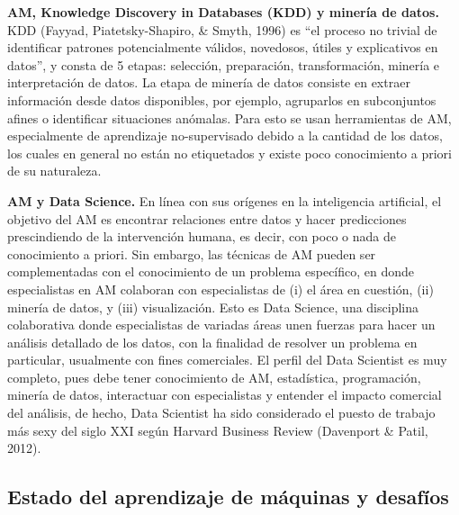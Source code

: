 \textbf{AM, Knowledge Discovery in Databases (KDD) y minería de datos.} KDD (Fayyad, Piatetsky-Shapiro, \& Smyth, 1996) es “el proceso no trivial de identificar patrones potencialmente válidos, novedosos, útiles y explicativos en datos”, y consta de 5 etapas: selección, preparación, transformación, minería e interpretación de datos. La etapa de minería de datos  consiste en extraer información desde datos disponibles, por ejemplo, agruparlos en subconjuntos afines o identificar situaciones anómalas. Para esto se usan herramientas de AM, especialmente de aprendizaje no-supervisado debido a la cantidad de los datos, los cuales en general no están no etiquetados y existe poco conocimiento a priori de su naturaleza. 

\textbf{AM y Data Science.} En línea con sus orígenes en la inteligencia artificial, el objetivo del AM es encontrar relaciones entre datos y hacer predicciones prescindiendo de la intervención humana, es decir, con poco o nada de conocimiento a priori. Sin embargo, las técnicas de AM pueden ser complementadas con el conocimiento de un problema específico, en donde especialistas en AM colaboran con especialistas de (i) el área en cuestión, (ii) minería de datos, y (iii) visualización. Esto es Data Science, una disciplina colaborativa donde especialistas de variadas áreas unen fuerzas para hacer un análisis detallado de los datos, con la finalidad de resolver un problema en particular, usualmente con fines comerciales. El perfil del Data Scientist es muy completo, pues debe tener conocimiento de AM, estadística, programación, minería de datos, interactuar con especialistas y entender el impacto comercial del análisis, de hecho, Data Scientist ha sido considerado el puesto de trabajo más sexy del siglo XXI según Harvard Business Review (Davenport \& Patil, 2012).

\subsection{Estado del aprendizaje de máquinas y desafíos}

